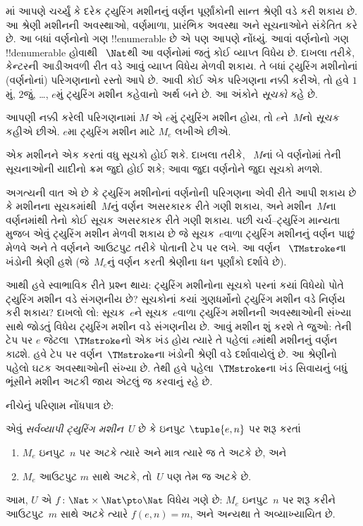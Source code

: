 \documentclass[../../../include/open-logic-section]{subfiles}
\begin{document}

માં આપણે ચર્ચ્યું કે દરેક ટ્યુરિંગ મશીનનું
વર્ણન પૂર્ણાંકોની સાન્ત શ્રેણી વડે કરી શકાય છે. આ શ્રેણી
મશીનની અવસ્થાઓ, વર્ણમાળા, પ્રારંભિક અવસ્થા અને સૂચનાઓને
સંકેતિત કરે છે. આ બધાં વર્ણનોનો ગણ !!{enumerable} છે એ
પણ આપણે નોંધ્યું. આવાં વર્ણનોનો ગણ !!{denumerable} હોવાથી
~$\Nat$થી આ વર્ણનોમાં જતું કોઈ વ્યાપ્ત વિધેય છે.
દાખલા તરીકે, કેન્ટરની આડીઅવળી રીત વડે આવું
વ્યાપ્ત વિધેય મેળવી શકાય. તે બધાં ટ્યુરિંગ
મશીનોનાં (વર્ણનોનાં) પરિગણનાનો રસ્તો આપે છે. આવી કોઈ
એક પરિગણના નક્કી કરીએ, તો હવે $1$મું, $2$જું, \dots,
$e$મું ટ્યુરિંગ મશીન કહેવાનો અર્થ બને છે. આ અંકોને
\emph{સૂચકો} કહે છે.

\begin{defn}
આપણી નક્કી કરેલી પરિગણનામાં $M$ એ $e$મું ટ્યુરિંગ
મશીન હોય, તો $e$ને~$M$નો \emph{સૂચક} કહીએ છીએ.
$e$મા ટ્યુરિંગ મશીન માટે $M_e$ લખીએ છીએ.
\end{defn}

એક મશીનને એક કરતાં વધુ સૂચકો હોઈ શકે. દાખલા તરીકે,
~$M$નાં બે વર્ણનોમાં તેની સૂચનાઓની યાદીનો ક્રમ જુદો
હોઈ શકે; આવા જુદા વર્ણનોને જુદા સૂચકો મળશે.

અગત્યની વાત એ છે કે ટ્યુરિંગ મશીનોનાં વર્ણનોની પરિગણના
એવી રીતે આપી શકાય છે કે મશીનના સૂચકમાંથી~$M$નું વર્ણન
અસરકારક રીતે ગણી શકાય, અને મશીન~$M$ના વર્ણનમાંથી
તેનો કોઈ સૂચક અસરકારક રીતે ગણી શકાય. પછી ચર્ચ--ટ્યુરિંગ
માન્યતા મુજબ એવું ટ્યુરિંગ મશીન મેળવી શકાય છે જે
સૂચક~$e$વાળા ટ્યુરિંગ મશીનનું વર્ણન પાછું મેળવે અને
તે વર્ણનને આઉટપુટ તરીકે પોતાની ટેપ પર લખે. આ વર્ણન
~$\TMstroke$ના ખંડોની શ્રેણી હશે (જે~$M_e$નું વર્ણન
કરતી શ્રેણીના ધન પૂર્ણાંકો દર્શાવે છે).

આથી હવે સ્વાભાવિક રીતે પ્રશ્ન થાય: ટ્યુરિંગ મશીનોના
સૂચકો પરનાં કયાં વિધેયો પોતે ટ્યુરિંગ મશીન વડે સંગણનીય
છે? સૂચકોનાં કયાં ગુણધર્મોનો ટ્યુરિંગ મશીન વડે નિર્ણય
કરી શકાય? દાખલો લો: સૂચક~$e$ને સૂચક~$e$વાળા ટ્યુરિંગ
મશીનની અવસ્થાઓની સંખ્યા સાથે જોડતું વિધેય ટ્યુરિંગ
મશીન વડે સંગણનીય છે. આવું મશીન શું કરશે તે જુઓ:
તેની ટેપ પર $e$ જેટલા~$\TMstroke$નો એક ખંડ હોય ત્યારે
તે પહેલાં $e$માંથી મશીનનું વર્ણન કાઢશે. હવે ટેપ પર
વર્ણન~$\TMstroke$ના ખંડોની શ્રેણી વડે દર્શાવાયેલું છે.
આ શ્રેણીનો પહેલો ઘટક અવસ્થાઓની સંખ્યા છે.
તેથી હવે પહેલા~$\TMstroke$ના ખંડ સિવાયનું બધું ભૂંસીને
મશીન અટકી જાય એટલું જ કરવાનું રહે છે.

નીચેનું પરિણામ નોંધપાત્ર છે:

\begin{thm} એવું \emph{સર્વવ્યાપી
  ટ્યુરિંગ મશીન}~$U$ છે કે ઇનપુટ $\tuple{e,n}$ પર શરૂ કરતાં
  \begin{enumerate}
    \item $M_e$ ઇનપુટ~$n$ પર અટકે ત્યારે અને માત્ર ત્યારે જ તે અટકે છે, અને
    \item $M_e$ આઉટપુટ $m$ સાથે અટકે, તો~$U$ પણ તેમ જ અટકે છે.
  \end{enumerate}
  આમ, $U$ એ $f\colon \Nat \times \Nat \pto \Nat$ વિધેય
  ગણે છે: $M_e$ ઇનપુટ~$n$ પર શરૂ કરીને આઉટપુટ~$m$
  સાથે અટકે ત્યારે $f(e,n) = m$, અને અન્યથા તે અવ્યાખ્યાયિત છે.
\end{thm}
\end{document}
